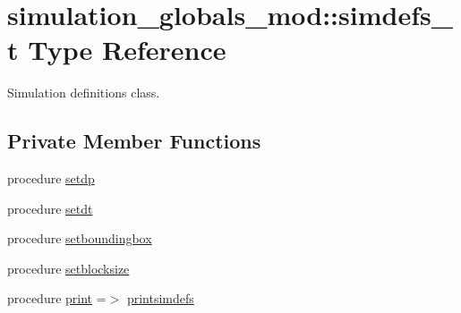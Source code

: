 \hypertarget{structsimulation__globals__mod_1_1simdefs__t}{}\section{simulation\+\_\+globals\+\_\+mod\+:\+:simdefs\+\_\+t Type Reference}
\label{structsimulation__globals__mod_1_1simdefs__t}


Simulation definitions class.  


\subsection*{Private Member Functions}
\begin{DoxyCompactItemize}
\item 
procedure \hyperlink{structsimulation__globals__mod_1_1simdefs__t_afca736d60d830235b7f84139eb5a1c0e}{setdp}
\item 
procedure \hyperlink{structsimulation__globals__mod_1_1simdefs__t_a80238515dc8566871b44ec89ee9fe1e7}{setdt}
\item 
procedure \hyperlink{structsimulation__globals__mod_1_1simdefs__t_a1f16ff24bfef17406b0d0ffe1d5bcce8}{setboundingbox}
\item 
procedure \hyperlink{structsimulation__globals__mod_1_1simdefs__t_ae55e67ff6ecd7045526f099a4bb77fac}{setblocksize}
\item 
procedure \hyperlink{structsimulation__globals__mod_1_1simdefs__t_a135110b50bcbd621d80df8f7b31fa60e}{print} =$>$ \hyperlink{namespacesimulation__globals__mod_ad331ccf019de7ed531e37c655600f90f}{printsimdefs}
\end{DoxyCompactItemize}
